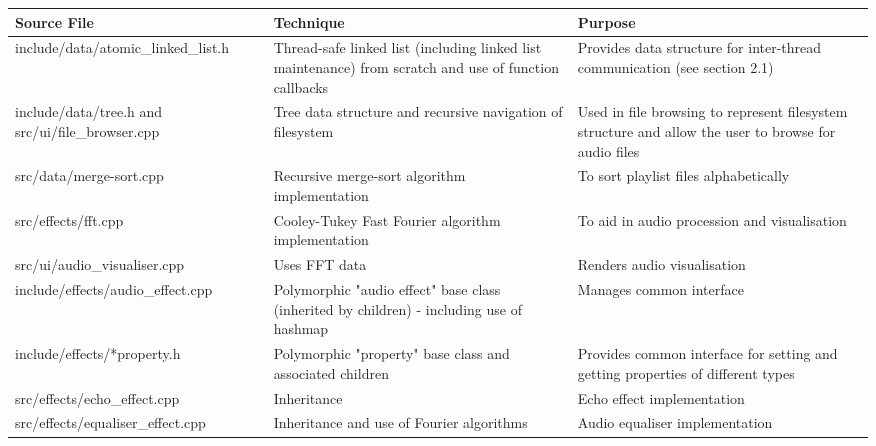 {
	\renewcommand{\arraystretch}{1.5}
	\begin{table}[h!]
		\begin{center}
			\begin{tabularx}{1.0 \textwidth} {
					| >{\raggedright\arraybackslash}X 
					| >{\raggedright\arraybackslash}X
					| >{\raggedright\arraybackslash}X 
					|
				}
				\hline
				Source File & Technique & Purpose \\
				
				\hline
				include/data/atomic\_linked\_list.h & Thread-safe linked list (including linked list maintenance) from scratch and use of function callbacks & Provides data structure for inter-thread communication (see section 2.1) \\
				
				\hline
				include/data/tree.h and src/ui/file\_browser.cpp & Tree data structure and recursive navigation of filesystem & Used in file browsing to represent filesystem structure and allow the user to browse for audio files \\
				
				\hline
				src/data/merge-sort.cpp & Recursive merge-sort  algorithm implementation & To sort playlist files alphabetically \\
				
				\hline
				src/effects/fft.cpp & Cooley-Tukey Fast Fourier algorithm implementation & To aid in audio procession and visualisation \\
				
				\hline
				src/ui/audio\_visualiser.cpp & Uses FFT data & Renders audio visualisation \\
				
				\hline
				include/effects/audio\_effect.cpp & Polymorphic "audio effect" base class (inherited by children) - including use of hashmap & Manages common interface \\
				
				\hline
				include/effects/*property.h & Polymorphic "property" base class and associated children & Provides common interface for setting and getting properties of different types \\
				
				\hline
				src/effects/echo\_effect.cpp & Inheritance & Echo effect implementation \\
				
				\hline
				src/effects/equaliser\_effect.cpp &  Inheritance and use of Fourier algorithms & Audio equaliser implementation \\
				

\end{tabularx}
\end{center}
\end{table}}
